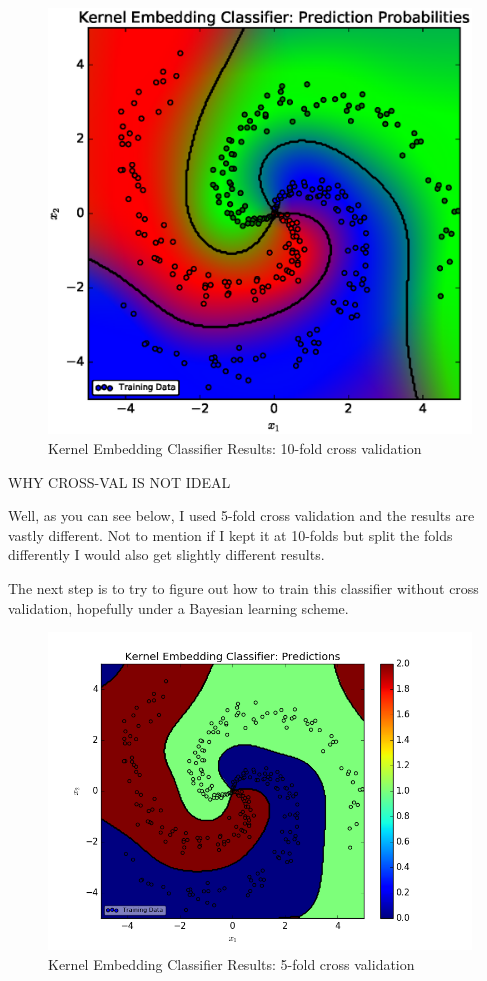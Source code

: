 \documentclass[a4paper, 12pt]{article}
\begin{document}
		\begin{figure}[!htbp]
			\centering
			\includegraphics[width=0.8\linewidth]{figures/10cv/figure4.eps}
			\caption{Kernel Embedding Classifier Results: 10-fold cross validation}
			\label{fig:figure_4}
		\end{figure}
		
		\newpage
		WHY CROSS-VAL IS NOT IDEAL
		
		Well, as you can see below, I used 5-fold cross validation and the results are vastly different. Not to mention if I kept it at 10-folds but split the folds differently I would also get slightly different results.
		
		The next step is to try to figure out how to train this classifier without cross validation, hopefully under a Bayesian learning scheme.

		\begin{figure}[!htbp]
			\centering
			\includegraphics[width=0.8\linewidth]{figures/5cv/figure_1.png}
			\caption{Kernel Embedding Classifier Results: 5-fold cross validation}
			\label{fig:5figure_1}
		\end{figure}
		
\end{document}
